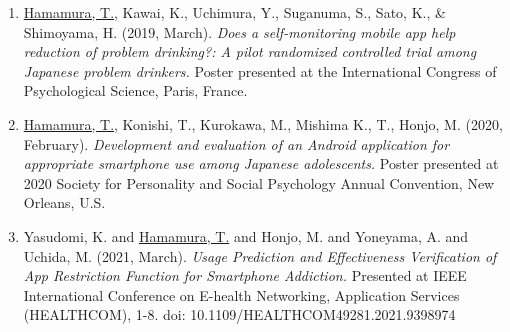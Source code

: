\documentclass{article}
\begin{document}
\begin{enumerate}
	\item \underline{Hamamura, T.}, Kawai, K., Uchimura, Y., Suganuma, S., Sato, K., \& Shimoyama, H. (2019, March). \textit{Does a self-monitoring mobile app help reduction of problem drinking?: A pilot randomized controlled trial among Japanese problem drinkers.} Poster presented at the International Congress of Psychological Science, Paris, France.
	\item \underline{Hamamura, T.}, Konishi, T., Kurokawa, M., Mishima K., T., Honjo, M. (2020, February). \textit{Development and evaluation of an Android application for appropriate smartphone use among Japanese adolescents.} Poster presented at 2020 Society for Personality and Social Psychology Annual Convention, New Orleans, U.S.
	\item Yasudomi, K. and \underline{Hamamura, T.} and Honjo, M. and Yoneyama, A. and Uchida, M. (2021, March). \textit{Usage Prediction and Effectiveness Verification of App Restriction Function for Smartphone Addiction.} Presented at IEEE International Conference on E-health Networking, Application Services (HEALTHCOM), 1-8. doi: 10.1109/HEALTHCOM49281.2021.9398974
	
\end{enumerate}
\end{document}
